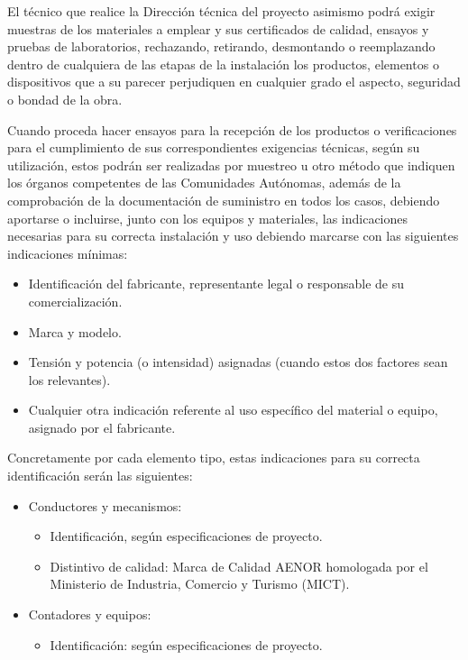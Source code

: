 \documentclass[../main.tex]{subfiles}
\begin{document}
\begin{itemize}
    \vspace{0.5 cm}
    El técnico que realice la Dirección técnica del proyecto asimismo podrá exigir muestras de los materiales a emplear y sus certificados de calidad, ensayos y pruebas de laboratorios, rechazando, retirando, desmontando o reemplazando dentro de cualquiera de las etapas de la instalación los productos, elementos o dispositivos que a su parecer perjudiquen en cualquier grado el aspecto, seguridad o bondad de la obra. \par
    \vspace{0.5 cm}
    Cuando proceda hacer ensayos para la recepción de los productos o verificaciones para el cumplimiento de sus correspondientes exigencias técnicas, según su utilización, estos podrán ser realizadas por muestreo u otro método que indiquen los órganos competentes de las Comunidades Autónomas, además de la comprobación de la documentación de suministro en todos los casos, debiendo aportarse o incluirse, junto con los equipos y materiales, las indicaciones necesarias para su correcta instalación y uso debiendo marcarse con las siguientes indicaciones mínimas: 
    \begin{itemize}
        \item Identificación del fabricante, representante legal o responsable de su comercialización.
        \item Marca y modelo.
        \item Tensión y potencia (o intensidad) asignadas (cuando estos dos factores sean los relevantes).
        \item Cualquier otra indicación referente al uso específico del material o equipo, asignado por el fabricante.
    \end{itemize}
    Concretamente por cada elemento tipo, estas indicaciones para su correcta identificación serán las siguientes:
    \begin{itemize}
        \item Conductores y mecanismos:
        \begin{itemize}
            \item Identificación, según especificaciones de proyecto.
            \item Distintivo de calidad: Marca de Calidad AENOR homologada por el Ministerio de Industria, Comercio y Turismo (MICT).
        \end{itemize}
        \item Contadores y equipos:
        \begin{itemize}
            \item Identificación: según especificaciones de proyecto.

\end{itemize}
\end{itemize}
\end{itemize}
\end{document}
